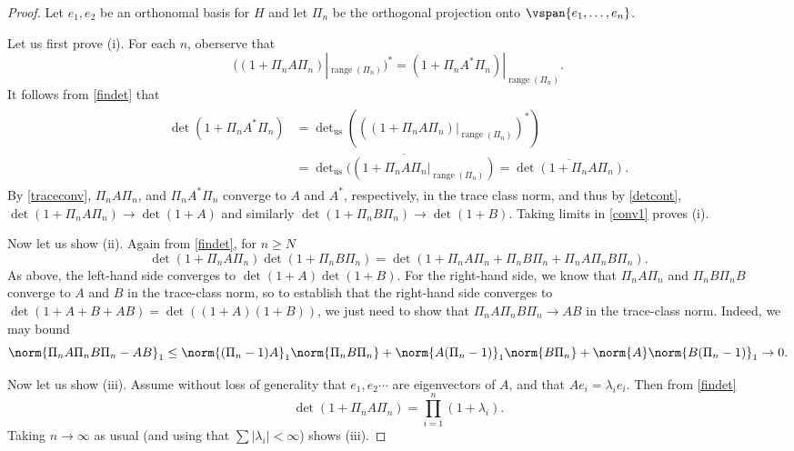 \documentclass[12pt]{amsart}
\DeclareMathOperator{\range}{range}
\begin{document}
\begin{proof}
Let $e_1,e_2$ be an orthonomal basis for $H$ and let $\Pi_n$ be the orthogonal projection onto $\vspan\{e_1,\ldots,e_n\}$.

Let us first prove (i). For each $n$, oberserve that \[((1+\Pi_n A \Pi_n)|_{\range(\Pi_n)})^\ast = (1+\Pi_n A^\ast \Pi_n)|_{\range(\Pi_n)}.\] It follows from \cref{findet} that
\begin{align}
\label{conv1}
\begin{split}\det(1+\Pi_n A^\ast \Pi_n) &= \det\nolimits_{\mathrm{us}}(((1+\Pi_n A \Pi_n)|_{\range(\Pi_n)})^\ast)\\
&=  \overline{\det\nolimits_{\mathrm{us}}((1+\Pi_nA\Pi_n|_{\range(\Pi_n)})} = \overline{\det(1+\Pi_nA\Pi_n)}.\end{split}\end{align}
By \cref{traceconv}, $\Pi_n A \Pi_n$, and $\Pi_n A^\ast \Pi_n$ converge to $A$ and $A^\ast$, respectively, in the trace class norm, and thus by \cref{detcont}, $\det(1+\Pi_n A \Pi_n) \to \det(1+A)$ and similarly $\det(1+\Pi_n B \Pi_n) \to \det(1+B)$. Taking limits in \eqref{conv1} proves (i).

Now let us show (ii). Again from \cref{findet}, for $n \geq N$
\[\det(1+\Pi_n A\Pi_n)\det(1+\Pi_nB\Pi_n) = \det(1+\Pi_nA\Pi_n + \Pi_nB\Pi_n + \Pi_nA\Pi_nB\Pi_n).\] As above, the left-hand side converges to $\det(1+A)\det(1+B)$. For the right-hand side, we know that $\Pi_nA\Pi_n$ and $\Pi_nB \Pi_nB$ converge to $A$ and $B$ in the trace-class norm, so to establish that the right-hand side converges to $\det(1+A+B+AB) = \det((1+A)(1+B))$, we just need to show that $\Pi_nA\Pi_nB\Pi_n \to AB$ in the trace-class norm. Indeed, we may bound
\[\norm{\Pi_nA\Pi_nB\Pi_n-AB}_1 \leq \norm{(\Pi_n-1)A}_1\norm{\Pi_nB\Pi_n} + \norm{A(\Pi_n-1)}_1\norm{B\Pi_n} + \norm{A}\norm{B(\Pi_n-1)}_1 \to 0.\]

Now let us show (iii). Assume without loss of generality that $e_1,e_2 \cdots$ are eigenvectors of $A$, and that $Ae_i = \lambda_ie_i$. Then from \cref{findet}
\[\det(1+\Pi_nA\Pi_n) = \prod_{i=1}^n (1+\lambda_i).\] Taking $n \to \infty$ as usual (and using that $\sum |\lambda_i| < \infty$) shows (iii).


\end{proof}
\end{document}
